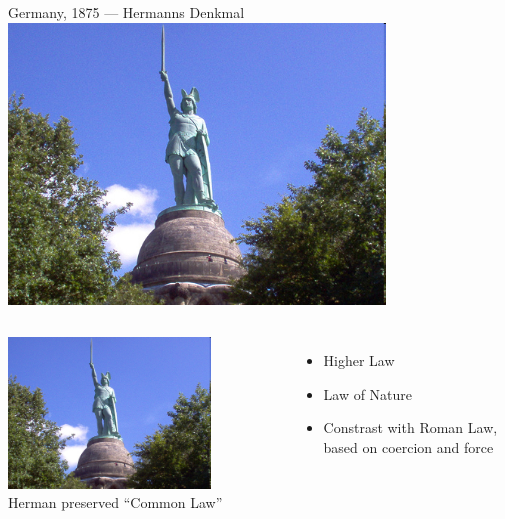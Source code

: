 \begin{frame}{Germany, 1875 --- Hermanns Denkmal}
    \centering
    \includegraphics[width=0.75\textwidth]{img/herman2.png} \\
\end{frame}

\begin{frame}
    \begin{columns}[onlytextwidth]
            \centering
            \includegraphics[width=0.75\textwidth]{img/herman2.png} \\

            Herman preserved ``Common Law''
            \pause
            \begin{itemize}
                \item Higher Law
                \pause
                \item Law of Nature
                \pause
                \item Constrast with Roman Law, based on coercion and force
            \end{itemize}
    \end{columns}
\end{frame}

